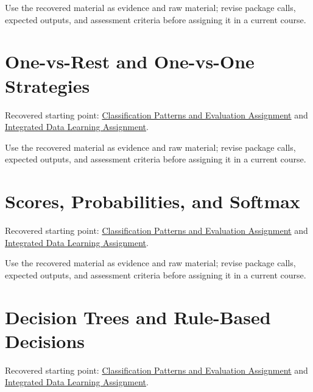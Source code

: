 \documentclass[
  letterpaper,
]{scrbook}
\begin{document}
Use the recovered material as evidence and raw material; revise package
calls, expected outputs, and assessment criteria before assigning it in
a current course.

\section*{One-vs-Rest and One-vs-One
Strategies}\label{sec-pr-08-one-vs-rest-and-one-vs-one-strategies}


Recovered starting point:
\hyperref[sec-lab-classification-patterns-assignment]{Classification
Patterns and Evaluation Assignment} and
\hyperref[sec-lab-integrated-learning-assignment]{Integrated Data
Learning Assignment}.

Use the recovered material as evidence and raw material; revise package
calls, expected outputs, and assessment criteria before assigning it in
a current course.

\section*{Scores, Probabilities, and
Softmax}\label{sec-pr-08-scores-probabilities-and-softmax}


Recovered starting point:
\hyperref[sec-lab-classification-patterns-assignment]{Classification
Patterns and Evaluation Assignment} and
\hyperref[sec-lab-integrated-learning-assignment]{Integrated Data
Learning Assignment}.

Use the recovered material as evidence and raw material; revise package
calls, expected outputs, and assessment criteria before assigning it in
a current course.

\section*{Decision Trees and Rule-Based
Decisions}\label{sec-pr-08-decision-trees-and-rule-based-decisions}


Recovered starting point:
\hyperref[sec-lab-classification-patterns-assignment]{Classification
Patterns and Evaluation Assignment} and
\hyperref[sec-lab-integrated-learning-assignment]{Integrated Data
Learning Assignment}.
\end{document}
